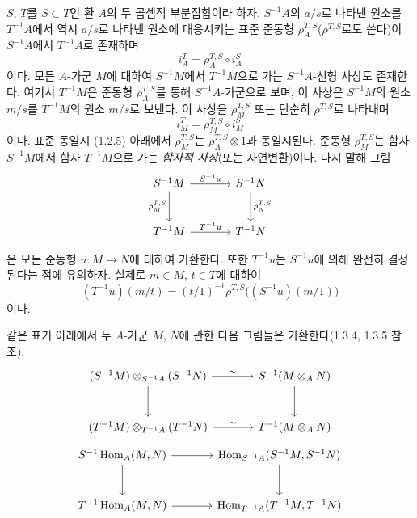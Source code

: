 \begin{env}[1.4.1]
\label{0.1.4.1-ko}
$S$, $T$를 $S\subset T$인 환 $A$의 두 곱셈적 부분집합이라 하자. $S^{-1}A$의 $a/s$로 나타낸 원소를 $T^{-1}A$에서 역시 $a/s$로 나타낸 원소에 대응시키는 표준 준동형 $\rho_A^{T,S}$($\rho^{T,S}$로도 쓴다)이 $S^{-1}A$에서 $T^{-1}A$로 존재하며
\[
  i_A^T=\rho_A^{T,S}\circ i_A^S
\]
이다.
모든 $A$-가군 $M$에 대하여 $S^{-1}M$에서 $T^{-1}M$으로 가는 $S^{-1}A$-선형 사상도 존재한다. 여기서 $T^{-1}M$은 준동형 $\rho_A^{T,S}$를 통해 $S^{-1}A$-가군으로 보며, 이 사상은 $S^{-1}M$의 원소 $m/s$를 $T^{-1}M$의 원소 $m/s$로 보낸다. 이 사상을 $\rho_M^{T,S}$ 또는 단순히 $\rho^{T,S}$로 나타내며
\[
  i_M^T=\rho_M^{T,S}\circ i_M^S
\]
이다. 표준 동일시 (1.2.5) 아래에서 $\rho_M^{T,S}$는 $\rho_A^{T,S}\otimes 1$과 동일시된다.
준동형 $\rho_M^{T,S}$는 함자 $S^{-1}M$에서 함자 $T^{-1}M$으로 가는 \emph{함자적 사상}(또는 자연변환)이다. 다시 말해 그림
\[
\begin{tikzcd}[column sep=large,row sep=large]
S^{-1}M \arrow[r,"S^{-1}u"] \arrow[d,"\rho_M^{T,S}"'] & S^{-1}N \arrow[d,"\rho_N^{T,S}"] \\
T^{-1}M \arrow[r,"T^{-1}u"] & T^{-1}N
\end{tikzcd}
\]

은 모든 준동형 $u:M\to N$에 대하여 가환한다. 또한 $T^{-1}u$는 $S^{-1}u$에 의해 완전히 결정된다는 점에 유의하자. 실제로 $m\in M$, $t\in T$에 대하여
\[
  (T^{-1}u)(m/t)=(t/1)^{-1}\rho^{T,S}\bigl((S^{-1}u)(m/1)\bigr)
\]
이다.
\end{env}

\begin{env}[1.4.2]
\label{0.1.4.2-ko}
같은 표기 아래에서 두 $A$-가군 $M$, $N$에 관한 다음 그림들은 가환한다(1.3.4, 1.3.5 참조).
\[
\begin{tikzcd}[column sep=large,row sep=large]
(S^{-1}M)\otimes_{S^{-1}A}(S^{-1}N) \arrow[r,"\sim"] \arrow[d]
  & S^{-1}(M\otimes_A N) \arrow[d]
  \\
(T^{-1}M)\otimes_{T^{-1}A}(T^{-1}N) \arrow[r,"\sim"]
  & T^{-1}(M\otimes_A N)
\end{tikzcd}
\]
\[
\begin{tikzcd}[column sep=large,row sep=large]
S^{-1}\operatorname{Hom}_A(M,N) \arrow[r] \arrow[d]
  & \operatorname{Hom}_{S^{-1}A}(S^{-1}M,S^{-1}N) \arrow[d] \\
T^{-1}\operatorname{Hom}_A(M,N) \arrow[r]
  & \operatorname{Hom}_{T^{-1}A}(T^{-1}M,T^{-1}N)
\end{tikzcd}
\]
\end{env}

